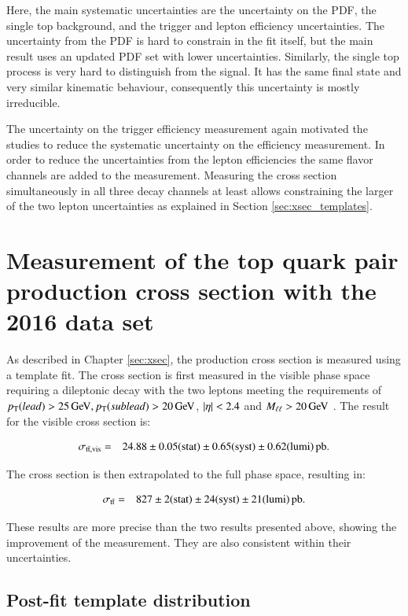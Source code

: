 Here, the main systematic uncertainties are the uncertainty on the PDF, the single top background, and the trigger and lepton efficiency uncertainties.
The uncertainty from the PDF is hard to constrain in the fit itself, but the main result uses an updated PDF set with lower uncertainties.
Similarly, the single top process is very hard to distinguish from the \ttbar signal. It has the same final state and very similar kinematic behaviour, consequently this uncertainty
is mostly irreducible.

The uncertainty on the trigger efficiency measurement again motivated the studies to reduce the systematic uncertainty on the efficiency measurement.
In order to reduce the uncertainties from the lepton efficiencies the same flavor channels are added to the measurement. Measuring the cross section
simultaneously in all three decay channels at least allows constraining the larger of the two lepton uncertainties as explained in Section \ref{sec:xsec_templates}.


\section{Measurement of the top quark pair production cross section with the 2016 data set}
\label{sec:results_main}

As described in Chapter \ref{sec:xsec}, the \ttbar production cross section is measured using a template fit.
The cross section is first measured in the visible phase space requiring a dileptonic decay with the two leptons meeting the requirements of $p_{\mathrm{T}} (lead) > 25 \,\text{Ge\hspace{-.08em}V}, p_{\mathrm{T}} (sublead) > 20\,\text{Ge\hspace{-.08em}V}$, $\lvert \eta \rvert < 2.4$ 
and $M_{\ell\ell} > 20 \,\text{Ge\hspace{-.08em}V}$ .
The result for the visible cross section is:

\begin{eqnarray*}
\sigma_{\mathrm{t}\bar{\mathrm{t}},\mathrm{vis}} & = & 24.88 \pm 0.05({\rm stat}) \pm 0.65 ({\rm syst}) \pm 0.62({\rm lumi})\mbox{\ensuremath{\,\text{pb}}}. 
\end{eqnarray*}

The cross section is then extrapolated to the full phase space, resulting in:

 \begin{eqnarray*}
\sigma_{\mathrm{t}\bar{\mathrm{t}}} & = & 827 \pm 2 ({\rm stat}) \pm 24 ({\rm syst}) \pm 21 ({\rm lumi}) \mbox{\ensuremath{\,\text{pb}}}.
\end{eqnarray*}

These results are more precise than the two results presented above, showing the improvement of the measurement.
They are also consistent within their uncertainties.

\subsection{Post-fit template distribution}
\label{sec:results_templates}

